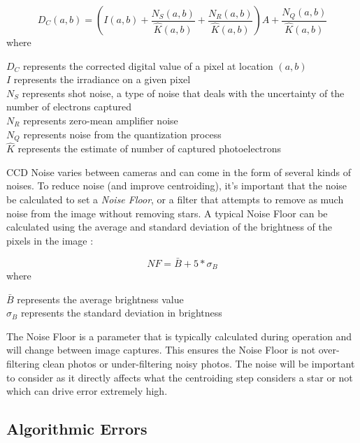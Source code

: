 \begin{equation} \label{noise_correction_eq}
    D_C(a,b) = \left( I(a,b) + \frac{N_S(a,b)}{\hat{K}(a,b)} + \frac{N_R(a,b)}{\hat{K}(a,b)} \right)A + \frac{N_Q(a,b)}{\hat{K}(a,b)}
\end{equation}
where

\begin{center}
    $D_C$ represents the corrected digital value of a pixel at location $(a,b)$ \\
    $I$ represents the irradiance on a given pixel \\
    $N_S$ represents shot noise, a type of noise that deals with the uncertainty of the number of electrons captured\\ 
    $N_R$ represents zero-mean amplifier noise \\
    $N_Q$ represents noise from the quantization process \\
    $\hat{K}$ represents the estimate of number of captured photoelectrons
\end{center}
 
\par \qquad CCD Noise varies between cameras and can come in the form of several kinds of noises.
To reduce noise (and improve centroiding), it's important that the noise be calculated to set a \emph{Noise Floor}, or a filter that attempts to remove as much noise from the image without removing stars.
A typical Noise Floor can be calculated using the average and standard deviation of the brightness of the pixels in the image \cite{accuracy_performance_of_star_trackers}:

\begin{equation}
    NF = \bar{B} + 5*\sigma_{B}
\end{equation}
where
\begin{center}
    $\bar{B}$ represents the average brightness value \\
    $\sigma_{B}$ represents the standard deviation in brightness
\end{center}

\par \qquad The Noise Floor is a parameter that is typically calculated during operation and will change between image captures. This ensures the Noise Floor is not over-filtering clean photos or under-filtering noisy photos.
The noise will be important to consider as it directly affects what the centroiding step considers a star or not which can drive error extremely high. 

\subsection*{Algorithmic Errors}

